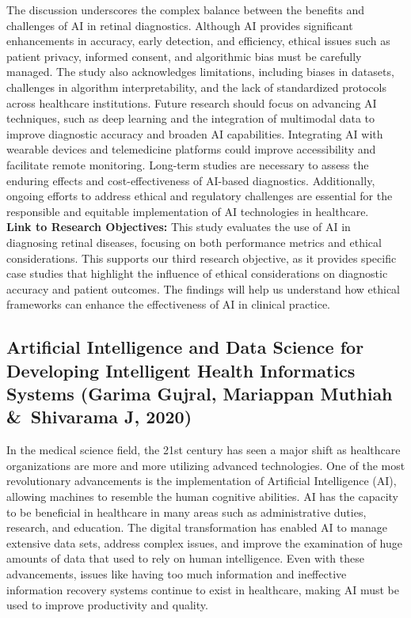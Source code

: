 \documentclass[a4paper, 12pt]{article}
\begin{document}
The discussion underscores the complex balance between the benefits and challenges of AI in retinal diagnostics. Although AI provides significant enhancements in accuracy, early detection, and efficiency, ethical issues such as patient privacy, informed consent, and algorithmic bias must be carefully managed. The study also acknowledges limitations, including biases in datasets, challenges in algorithm interpretability, and the lack of standardized protocols across healthcare institutions. Future research should focus on advancing AI techniques, such as deep learning and the integration of multimodal data to improve diagnostic accuracy and broaden AI capabilities. Integrating AI with wearable devices and telemedicine platforms could improve accessibility and facilitate remote monitoring. Long-term studies are necessary to assess the enduring effects and cost-effectiveness of AI-based diagnostics. Additionally, ongoing efforts to address ethical and regulatory challenges are essential for the responsible and equitable implementation of AI technologies in healthcare.\\

\textbf{Link to Research Objectives:} This study evaluates the use of AI in diagnosing retinal diseases, focusing on both performance metrics and ethical considerations. This supports our third research objective, as it provides specific case studies that highlight the influence of ethical considerations on diagnostic accuracy and patient outcomes. The findings will help us understand how ethical frameworks can enhance the effectiveness of AI in clinical practice.


\subsection{Artificial Intelligence and Data Science for Developing Intelligent Health Informatics Systems (Garima Gujral, Mariappan Muthiah \&\ Shivarama J, 2020)}
In the medical science field, the 21st century has seen a major shift as healthcare organizations are more and more utilizing advanced technologies. One of the most revolutionary advancements is the implementation of Artificial Intelligence (AI), allowing machines to resemble the human cognitive abilities. AI has the capacity to be beneficial in healthcare in many areas such as administrative duties, research, and education. The digital transformation has enabled AI to manage extensive data sets, address complex issues, and improve the examination of huge amounts of data that used to rely on human intelligence. Even with these advancements, issues like having too much information and ineffective information recovery systems continue to exist in healthcare, making AI must be used to improve productivity and quality.\\
\end{document}
